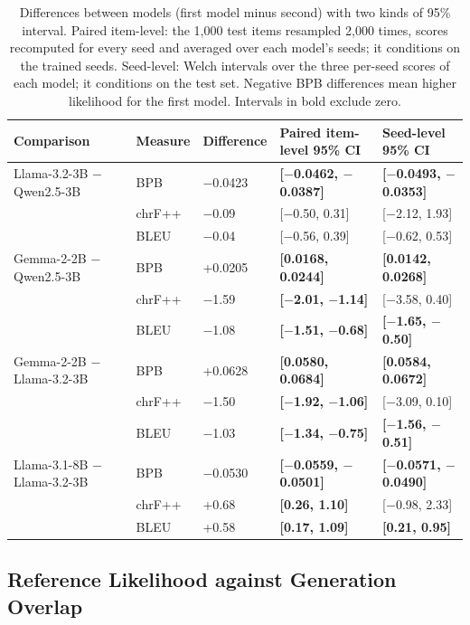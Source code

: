 \documentclass{article}
\begin{document}
\begin{table}[tbp]
\centering
\fontsize{8.5}{10}\selectfont
\setlength{\tabcolsep}{3pt}
\caption{Differences between models (first model minus second) with two kinds of 95\% interval. Paired item-level: the 1,000 test items resampled 2,000 times, scores recomputed for every seed and averaged over each model's seeds; it conditions on the trained seeds. Seed-level: Welch intervals over the three per-seed scores of each model; it conditions on the test set. Negative BPB differences mean higher likelihood for the first model. Intervals in bold exclude zero.}\label{tab:diffs}
\begin{tabular}{@{}L{146.7pt}L{45.5pt}R{60.5pt}R{93.5pt}R{93.5pt}@{}}
\toprule
\textbf{Comparison} & \textbf{Measure} & \textbf{Difference} & \textbf{Paired item-level 95\% CI} & \textbf{Seed-level 95\% CI} \\
\midrule
Llama-3.2-3B $-$ Qwen2.5-3B & BPB & $-$0.0423 & \textbf{[$-$0.0462, $-$0.0387]} & \textbf{[$-$0.0493, $-$0.0353]} \\
 & chrF++ & $-$0.09 & [$-$0.50, 0.31] & [$-$2.12, 1.93] \\
 & BLEU & $-$0.04 & [$-$0.56, 0.39] & [$-$0.62, 0.53] \\
Gemma-2-2B $-$ Qwen2.5-3B & BPB & +0.0205 & \textbf{[0.0168, 0.0244]} & \textbf{[0.0142, 0.0268]} \\
 & chrF++ & $-$1.59 & \textbf{[$-$2.01, $-$1.14]} & [$-$3.58, 0.40] \\
 & BLEU & $-$1.08 & \textbf{[$-$1.51, $-$0.68]} & \textbf{[$-$1.65, $-$0.50]} \\
Gemma-2-2B $-$ Llama-3.2-3B & BPB & +0.0628 & \textbf{[0.0580, 0.0684]} & \textbf{[0.0584, 0.0672]} \\
 & chrF++ & $-$1.50 & \textbf{[$-$1.92, $-$1.06]} & [$-$3.09, 0.10] \\
 & BLEU & $-$1.03 & \textbf{[$-$1.34, $-$0.75]} & \textbf{[$-$1.56, $-$0.51]} \\
Llama-3.1-8B $-$ Llama-3.2-3B & BPB & $-$0.0530 & \textbf{[$-$0.0559, $-$0.0501]} & \textbf{[$-$0.0571, $-$0.0490]} \\
 & chrF++ & +0.68 & \textbf{[0.26, 1.10]} & [$-$0.98, 2.33] \\
 & BLEU & +0.58 & \textbf{[0.17, 1.09]} & \textbf{[0.21, 0.95]} \\
\bottomrule
\end{tabular}
\end{table}

\subsection{Reference Likelihood against Generation Overlap}\label{sec:res-lik}
\end{document}
